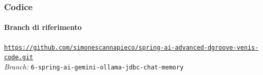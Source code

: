 %
\begin{frame}[fragile] \frametitle{Codice}
    \framesubtitle{Branch di riferimento}
	\begin{center}
		{\scriptsize \href{https://github.com/simonescannapieco/spring-ai-advanced-dgroove-venis-code.git}{\texttt{https://github.com/simonescannapieco/spring-ai-advanced-dgroove-venis-code.git}}}\\
		\textit{Branch:} \alert{\texttt{6-spring-ai-gemini-ollama-jdbc-chat-memory}}
	\end{center}
\end{frame}